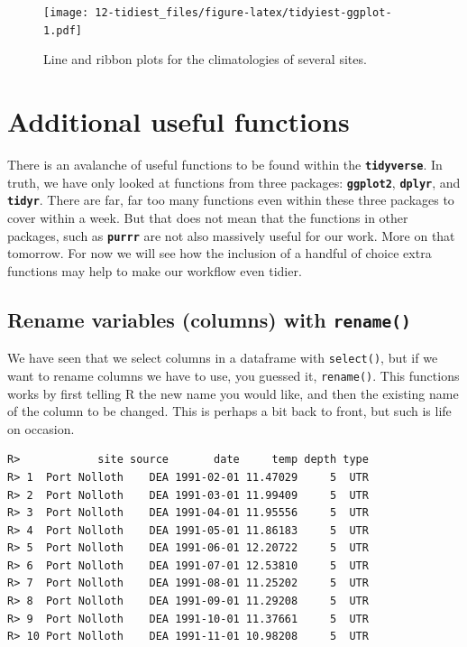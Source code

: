 \documentclass[]{book}
\newenvironment{Shaded}{\begin{snugshade}}{\end{snugshade}}
\newcommand{\KeywordTok}[1]{\textcolor[rgb]{0.13,0.29,0.53}{\textbf{#1}}}
\newcommand{\DataTypeTok}[1]{\textcolor[rgb]{0.13,0.29,0.53}{#1}}
\newcommand{\StringTok}[1]{\textcolor[rgb]{0.31,0.60,0.02}{#1}}
\newcommand{\OperatorTok}[1]{\textcolor[rgb]{0.81,0.36,0.00}{\textbf{#1}}}
\newcommand{\NormalTok}[1]{#1}
\theoremstyle{definition}
\theoremstyle{definition}
\theoremstyle{definition}
\theoremstyle{remark}
\begin{document}
\begin{figure}
\centering
\texttt{[image: 12-tidiest\_files/figure-latex/tidyiest-ggplot-1.pdf]}
\caption{\label{fig:tidyiest-ggplot}Line and ribbon plots for the
climatologies of several sites.}
\end{figure}

\section{Additional useful functions}\label{additional-useful-functions}

There is an avalanche of useful functions to be found within the
\textbf{\texttt{tidyverse}}. In truth, we have only looked at functions
from three packages: \textbf{\texttt{ggplot2}}, \textbf{\texttt{dplyr}},
and \textbf{\texttt{tidyr}}. There are far, far too many functions even
within these three packages to cover within a week. But that does not
mean that the functions in other packages, such as
\textbf{\texttt{purrr}} are not also massively useful for our work. More
on that tomorrow. For now we will see how the inclusion of a handful of
choice extra functions may help to make our workflow even tidier.

\subsection{\texorpdfstring{Rename variables (columns) with
\texttt{rename()}}{Rename variables (columns) with rename()}}\label{rename-variables-columns-with-rename}

We have seen that we select columns in a dataframe with
\texttt{select()}, but if we want to rename columns we have to use, you
guessed it, \texttt{rename()}. This functions works by first telling R
the new name you would like, and then the existing name of the column to
be changed. This is perhaps a bit back to front, but such is life on
occasion.

\begin{Shaded}
\end{Shaded}

\begin{verbatim}
R>            site source       date     temp depth type
R> 1  Port Nolloth    DEA 1991-02-01 11.47029     5  UTR
R> 2  Port Nolloth    DEA 1991-03-01 11.99409     5  UTR
R> 3  Port Nolloth    DEA 1991-04-01 11.95556     5  UTR
R> 4  Port Nolloth    DEA 1991-05-01 11.86183     5  UTR
R> 5  Port Nolloth    DEA 1991-06-01 12.20722     5  UTR
R> 6  Port Nolloth    DEA 1991-07-01 12.53810     5  UTR
R> 7  Port Nolloth    DEA 1991-08-01 11.25202     5  UTR
R> 8  Port Nolloth    DEA 1991-09-01 11.29208     5  UTR
R> 9  Port Nolloth    DEA 1991-10-01 11.37661     5  UTR
R> 10 Port Nolloth    DEA 1991-11-01 10.98208     5  UTR
\end{verbatim}
\end{document}
